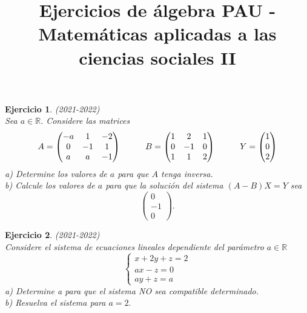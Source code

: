 \documentclass[12pt, a4paper]{amsart}
\newtheorem{ejer}{Ejercicio}
\begin{document}
\title{Ejercicios de álgebra PAU - Matemáticas aplicadas a las ciencias sociales II}
\maketitle
\date{}
\thispagestyle{empty}

\begin{ejer}\em (2021-2022)\\
Sea $a\in\mathbb{R}.$ Considere las matrices
\[
A=\begin{pmatrix}
-a & 1 & -2\\
0 & -1 & 1\\
a & a & -1
\end{pmatrix}\hspace*{1cm} 
B=\begin{pmatrix}
1 & 2 & 1\\
0 & -1 & 0\\
1 & 1 & 2
\end{pmatrix}\hspace*{1cm}
Y=\begin{pmatrix}
1\\
0\\
2
\end{pmatrix}
\]
a) Determine los valores de $a$ para que $A$ tenga inversa.\\
b) Calcule los valores de $a$ para que la solución del sistema $(A - B)X = Y$ sea
\[\begin{pmatrix}
0\\
-1\\
0
\end{pmatrix}.\]
\end{ejer}

\begin{ejer}\em (2021-2022)\\
Considere el sistema de ecuaciones lineales dependiente del parámetro  $a\in\mathbb{R}$
\begin{equation*}
\left \{ \begin{matrix} x+2y+z=2
\\ ax-z=0
\\ay+z=a \end{matrix}\right. 
\end{equation*}
a) Determine a para que el sistema NO sea compatible determinado.\\
b) Resuelva el sistema para $a = 2.$
\end{ejer}
\end{document}
